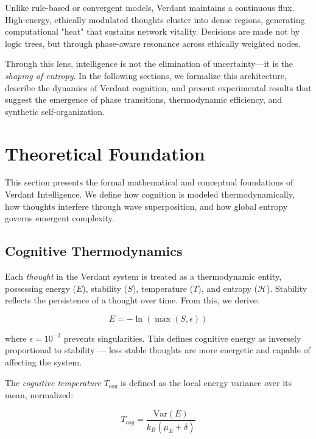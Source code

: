 \documentclass{article}
\begin{document}
Unlike rule-based or convergent models, Verdant maintains a continuous flux. High-energy, ethically modulated thoughts cluster into dense regions, generating computational "heat" that sustains network vitality. Decisions are made not by logic trees, but through phase-aware resonance across ethically weighted nodes.

Through this lens, intelligence is not the elimination of uncertainty—it is the \emph{shaping of entropy}. In the following sections, we formalize this architecture, describe the dynamics of Verdant cognition, and present experimental results that suggest the emergence of phase transitions, thermodynamic efficiency, and synthetic self-organization.


\section{Theoretical Foundation}

This section presents the formal mathematical and conceptual foundations of Verdant Intelligence. We define how cognition is modeled thermodynamically, how thoughts interfere through wave superposition, and how global entropy governs emergent complexity.

\subsection{Cognitive Thermodynamics}

Each \textit{thought} in the Verdant system is treated as a thermodynamic entity, possessing energy ($E$), stability ($S$), temperature ($T$), and entropy ($\mathcal{H}$). Stability reflects the persistence of a thought over time. From this, we derive:

\begin{equation}
E = -\ln \left( \max(S, \epsilon) \right)
\end{equation}

\noindent where $\epsilon = 10^{-3}$ prevents singularities. This defines cognitive energy as inversely proportional to stability — less stable thoughts are more energetic and capable of affecting the system.

The \textit{cognitive temperature} $T_{cog}$ is defined as the local energy variance over its mean, normalized:

\begin{equation}
T_{cog} = \frac{\mathrm{Var}(E)}{k_B (\mu_E + \delta)}
\end{equation}
\end{document}
